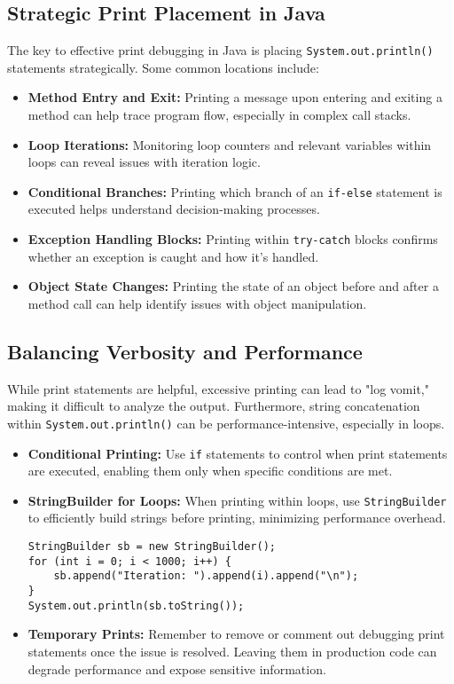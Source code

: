 \documentclass{article}
\begin{document}
{{{{\subsection*{Strategic Print Placement in Java}

The key to effective print debugging in Java is placing \texttt{System.out.println()} statements strategically. Some common locations include:

\begin{itemize}
\item \textbf{Method Entry and Exit:} Printing a message upon entering and exiting a method can help trace program flow, especially in complex call stacks.
\item \textbf{Loop Iterations:} Monitoring loop counters and relevant variables within loops can reveal issues with iteration logic.
\item \textbf{Conditional Branches:} Printing which branch of an \texttt{if-else} statement is executed helps understand decision-making processes.
\item \textbf{Exception Handling Blocks:}  Printing within \texttt{try-catch} blocks confirms whether an exception is caught and how it's handled.
\item \textbf{Object State Changes:} Printing the state of an object before and after a method call can help identify issues with object manipulation.
\end{itemize}

\subsection*{Balancing Verbosity and Performance}

While print statements are helpful, excessive printing can lead to "log vomit," making it difficult to analyze the output. Furthermore, string concatenation within \texttt{System.out.println()} can be performance-intensive, especially in loops.

\begin{itemize}
\item \textbf{Conditional Printing:} Use \texttt{if} statements to control when print statements are executed, enabling them only when specific conditions are met.
\item \textbf{StringBuilder for Loops:}  When printing within loops, use \texttt{StringBuilder} to efficiently build strings before printing, minimizing performance overhead.
\begin{verbatim}
StringBuilder sb = new StringBuilder();
for (int i = 0; i < 1000; i++) {
    sb.append("Iteration: ").append(i).append("\n");
}
System.out.println(sb.toString());
\end{verbatim}
\item \textbf{Temporary Prints:} Remember to remove or comment out debugging print statements once the issue is resolved.  Leaving them in production code can degrade performance and expose sensitive information.
\end{itemize}

}}}}
\end{document}
